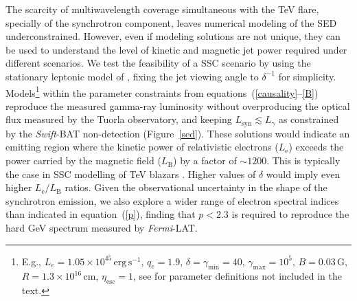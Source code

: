 \documentclass[twocolumn]{aastex6}
\def\lat{\textit{Fermi}-LAT}
\begin{document}
The scarcity of multiwavelength coverage simultaneous with the TeV flare, specially of the synchrotron component, leaves numerical modeling of the SED underconstrained.  However, even if modeling solutions are not unique, they
can be used to understand the level of kinetic and magnetic jet power required under different scenarios. 
We test the feasibility of a SSC scenario by using the stationary leptonic model of \citet{2013ApJ...768...54B}, fixing the jet viewing angle to $\delta^{-1}$ for simplicity. 
Models\footnote{E.g., $L_e=1.05\times10^{45}\,\mathrm{erg}\,\mathrm{s^{-1}}$, $q_e=1.9$, $\delta = \gamma_\mathrm{min}=40$, $\gamma_\mathrm{max}=10^5$, $B=0.03\,\mathrm{G}$, $R=1.3\times10^{16}\,\mathrm{cm}$, $\eta_\mathrm{esc} =1$, see \citet{2013ApJ...768...54B} for parameter definitions not included in the text.} within the parameter constraints from equations~(\ref{causality}--\ref{B}) reproduce the measured gamma-ray luminosity without overproducing the optical flux measured by the Tuorla observatory, 
and keeping $L_\mathrm{syn} \lesssim L_\gamma$ as constrained by the {\it Swift}-BAT non-detection (Figure~\ref{sed}).
These solutions would indicate an emitting region where the kinetic power of relativistic electrons ($L_\mathrm{e}$) exceeds the power carried by the magnetic field ($L_\mathrm{B}$) by a factor of $\sim 1200$.
This is typically the case in SSC modelling of TeV blazars \citep[see, e.g., ][]{veritas_1215}.
Higher values of $\delta$ would imply even higher $L_\mathrm{e}/L_\mathrm{B}$ ratios. 
Given the observational uncertainty in the shape of the synchrotron emission, we also explore a wider range of electron spectral indices than indicated in equation~(\ref{p}), finding that $p < 2.3$ is required to reproduce the hard GeV spectrum measured by \lat. 
\end{document}
